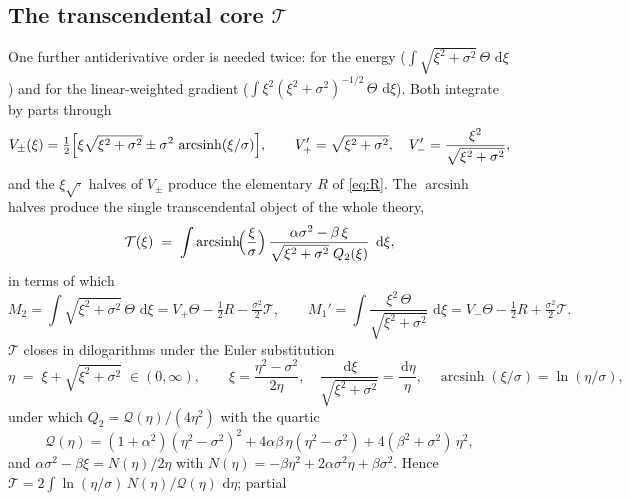 \documentclass[11pt]{article}
\newcommand{\asinh}{\operatorname{arcsinh}}
\newcommand{\dd}{\,\mathrm{d}}
\begin{document}
\subsection{The transcendental core $\mathcal T$}
\label{sec:T}

One further antiderivative order is needed twice: for the energy
($\int\!\sqrt{\xi^2+\sigma^2}\,\Theta\,\dd\xi$) and for the linear-weighted gradient
($\int\!\xi^2(\xi^2+\sigma^2)^{-1/2}\,\Theta\,\dd\xi$).  Both integrate by parts
through
\begin{equation}
  V_\pm(\xi) = \tfrac12\Bigl[\xi\sqrt{\xi^2+\sigma^2}
               \pm \sigma^2\,\asinh(\xi/\sigma)\Bigr],
  \qquad
  V_+'=\sqrt{\xi^2+\sigma^2},\quad V_-'=\frac{\xi^2}{\sqrt{\xi^2+\sigma^2}} ,
\end{equation}
and the $\xi\sqrt{\cdot}$ halves of $V_\pm$ produce the elementary $R$ of
\eqref{eq:R}.  The $\asinh$ halves produce the single transcendental object of the
whole theory,
\begin{equation}
  \mathcal T(\xi) \;=\;
  \int \asinh\!\Bigl(\frac{\xi}{\sigma}\Bigr)\,
  \frac{\alpha\sigma^2-\beta\,\xi}{\sqrt{\xi^2+\sigma^2}\;Q_2(\xi)}\;\dd\xi ,
  \label{eq:Tdef}
\end{equation}
in terms of which
\begin{equation}
  M_2 = \int\!\sqrt{\xi^2{+}\sigma^2}\,\Theta\,\dd\xi
      = V_+\Theta-\tfrac12 R-\tfrac{\sigma^2}{2}\mathcal T ,
  \qquad
  M_1' = \int\!\frac{\xi^2\,\Theta}{\sqrt{\xi^2{+}\sigma^2}}\,\dd\xi
       = V_-\Theta-\tfrac12 R+\tfrac{\sigma^2}{2}\mathcal T .
  \label{eq:M2M1p}
\end{equation}
$\mathcal T$ closes in dilogarithms under the Euler substitution
\begin{equation}
  \eta \;=\; \xi+\sqrt{\xi^2+\sigma^2}\;\in(0,\infty),
  \qquad
  \xi=\frac{\eta^2-\sigma^2}{2\eta},\quad
  \frac{\dd\xi}{\sqrt{\xi^2+\sigma^2}}=\frac{\dd\eta}{\eta},\quad
  \asinh(\xi/\sigma)=\ln(\eta/\sigma) ,
\end{equation}
under which $Q_2=\mathcal Q(\eta)/(4\eta^2)$ with the quartic
\begin{equation}
  \mathcal Q(\eta) = (1{+}\alpha^2)(\eta^2{-}\sigma^2)^2
                     + 4\alpha\beta\,\eta(\eta^2{-}\sigma^2)
                     + 4(\beta^2{+}\sigma^2)\,\eta^2 ,
\end{equation}
and $\alpha\sigma^2-\beta\xi = N(\eta)/2\eta$ with
$N(\eta)=-\beta\eta^2+2\alpha\sigma^2\eta+\beta\sigma^2$.  Hence
$\mathcal T = 2\!\int \ln(\eta/\sigma)\,N(\eta)/\mathcal Q(\eta)\,\dd\eta$; partial
\end{document}
